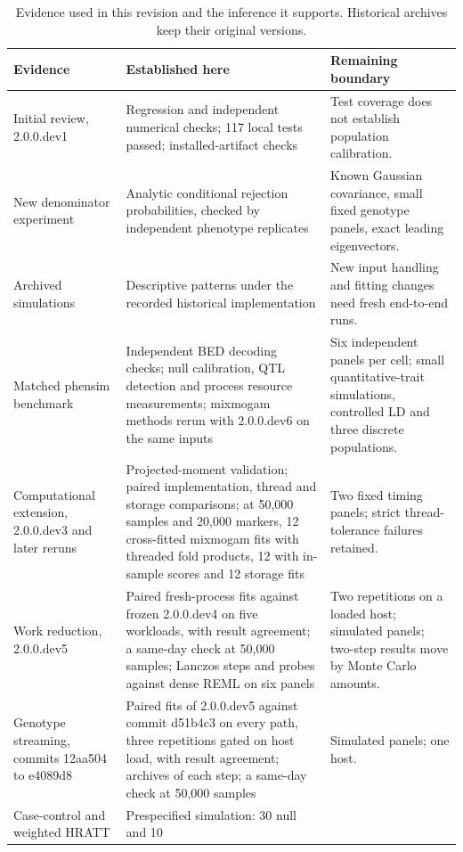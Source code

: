 \documentclass[11pt]{article}
\begin{document}
\begin{table}[htbp]
\centering\small
\caption{Evidence used in this revision and the inference it supports.
Historical archives keep their original versions.}
\label{tab:evidence}
\begin{tabularx}{\textwidth}{@{}>{\raggedright\arraybackslash}p{}>{\raggedright\arraybackslash}X>{\raggedright\arraybackslash}X@{}}
\toprule
Evidence & Established here & Remaining boundary \\
\midrule
Initial review, 2.0.0.dev1 & Regression and independent numerical checks;
117 local tests passed; installed-artifact checks & Test coverage does
not establish population calibration. \\
New denominator experiment & Analytic conditional rejection probabilities,
checked by independent phenotype replicates & Known Gaussian covariance,
small fixed genotype panels, exact leading eigenvectors. \\
Archived simulations & Descriptive patterns under the recorded historical
implementation & New input handling and fitting changes need fresh
end-to-end runs. \\
Matched phensim benchmark & Independent BED decoding checks; null
calibration, QTL detection and process resource measurements; mixmogam
methods rerun with 2.0.0.dev6 on the same inputs &
Six independent panels per cell; small quantitative-trait simulations,
controlled LD and three discrete populations. \\
Computational extension, 2.0.0.dev3 and later reruns & Projected-moment validation;
paired implementation, thread and storage comparisons; at 50,000 samples and
20,000 markers, 12 cross-fitted mixmogam fits with threaded fold products,
12 with in-sample scores and 12 storage fits & Two fixed timing panels;
strict thread-tolerance failures retained. \\
Work reduction, 2.0.0.dev5 & Paired fresh-process fits against frozen
2.0.0.dev4 on five workloads, with result agreement; a same-day check at
50,000 samples; Lanczos steps and probes against dense REML on six panels &
Two repetitions on a loaded host; simulated panels; two-step results move
by Monte Carlo amounts. \\
Genotype streaming, commits 12aa504 to e4089d8 & Paired fits of 2.0.0.dev5
against commit d51b4c3 on every path, three repetitions gated on host
load, with result agreement; archives of each step; a same-day check at
50,000 samples & Simulated panels; one host. \\
Case-control and weighted HRATT & Prespecified simulation: 30 null and 10

\end{tabularx}
\end{table}
\end{document}
